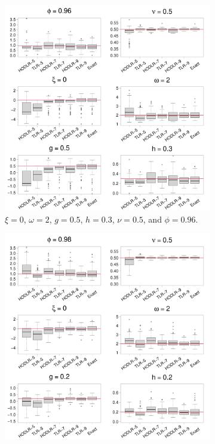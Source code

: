 \documentclass[conference]{IEEEtran}
\begin{document}
\begin{figure}[htp!]
\centering
\begin{subfigure}{0.44\textwidth}%
  \centering
  \includegraphics[width=\linewidth]{./figures/boxplot_0.960000_0.500000_0.300000.pdf}
  \caption{$\xi = 0$, $\omega = 2$, $g = 0.5$, $h = 0.3$, $\nu = 0.5$, and $\phi = 0.96$.}
\end{subfigure}%
\hspace{4mm}
\begin{subfigure}{0.44\textwidth}%
  \centering
  \includegraphics[width=\linewidth]{./figures/boxplot_0.980000_0.200000_0.200000.pdf}

\end{subfigure}
\end{figure}
\end{document}
